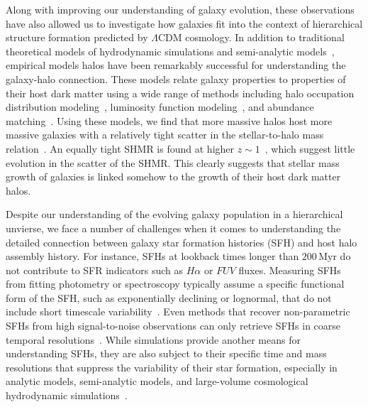 \documentclass[12pt, letterpaper, preprint, tighten]{aastex62}
\begin{document}
Along with improving our understanding of galaxy evolution, these
observations have also allowed us to investigate how galaxies fit 
into the context of hierarchical structure formation predicted
by $\Lambda$CDM cosmology. In addition to traditional theoretical 
models of hydrodynamic simulations and semi-analytic 
models~\citep[see][for reviews]{silk2012, somerville2015}, 
empirical models halos have been remarkably successful for 
understanding the galaxy-halo connection. These models relate galaxy 
properties to properties of their host dark matter using a wide 
range of methods including halo occupation distribution 
modeling~\citep[HOD; \emph{e.g.}][]{zheng2007,zehavi2011,leauthaud2012,parejko2013,zu2015}, 
luminosity function modeling~\citep[\emph{e.g.}][]{yang2009}, and abundance 
matching~\citep[\emph{e.g.}][]{kravtsov2004, vale2006, conroy2009, moster2013, reddick2013}.
Using these models, we find that more massive halos host more 
massive galaxies with a relatively tight scatter in the stellar-to-halo 
mass relation~\citep[hereafter SHMR;][]{mandelbaum2006a, conroy2007, more2011, leauthaud2012, tinker2013, velander2014, han2015, zu2015, gu2016, lange2018a}. An equally tight SHMR is found at higher 
$z\sim1$~\citep{leauthaud2012, tinker2013, patel2015}, which suggest
little evolution in the scatter of the SHMR. This clearly suggests
that stellar mass growth of galaxies is linked somehow to the growth 
of their host dark matter halos.

Despite our understanding of the evolving galaxy population in a
hierarchical unvierse, we face a number of challenges when it comes 
to understanding the detailed connection between galaxy star formation 
histories (SFH) and host halo assembly history. 
For instance, SFHs at lookback times longer than $200\,\mathrm{Myr}$ 
do not contribute to SFR indicators such as $H\alpha$ or $FUV$ fluxes.
Measuring SFHs from fitting photometry or spectroscopy typically 
assume a specific functional form of the SFH, such as exponentially 
declining or lognormal, that do not include short timescale 
variability~\citep[\emph{e.g.}][]{wilkinson2017, carnall2018}. 
Even methods that recover non-parametric SFHs from high signal-to-noise 
observations can only retrieve SFHs in coarse temporal resolutions~\citep[\emph{e.g.}][]{tojeiro2009, leja2018a}. 
While simulations provide another means for understanding SFHs, 
they are also subject to their specific time and mass resolutions that 
suppress the variability of their star formation, especially in 
analytic models, semi-analytic models, and large-volume cosmological 
hydrodynamic simulations~\citep{sparre2015, sparre2017}.
\end{document}
